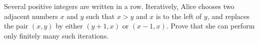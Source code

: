 Several positive integers are written in a row. Iteratively, Alice chooses two adjacent numbers $x$ and $y$ such that $x > y$ and $x$ is to the left of $y$, and replaces the pair $(x, y)$ by either $(y + 1, x)$ or $(x - 1, x)$. Prove that she can perform only finitely many such iterations.
